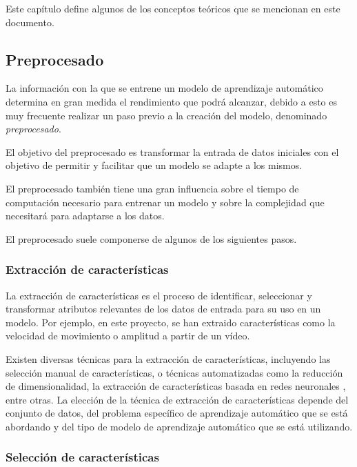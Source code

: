 \label{cha:Conceptos teóricos}

Este capítulo define algunos de los conceptos teóricos que se mencionan en este
documento.

\subsection{Preprocesado}

La información con la que se entrene un modelo de aprendizaje automático
determina en gran medida el rendimiento que podrá alcanzar, debido a esto es muy
frecuente realizar un paso previo a la creación del modelo, denominado
\textit{preprocesado}.

El objetivo del preprocesado es transformar la entrada de datos iniciales con el
objetivo de permitir y facilitar que un modelo se adapte a los mismos.

El preprocesado también tiene una gran influencia sobre el tiempo de computación
necesario para entrenar un modelo y sobre la complejidad que necesitará para
adaptarse a los datos.

El preprocesado suele componerse de algunos de los siguientes pasos.

\subsubsection{Extracción de características}

La extracción de características es el proceso de identificar, seleccionar y
transformar atributos relevantes de los datos de entrada para su uso en un
modelo. Por ejemplo, en este proyecto, se han extraido características como la
velocidad de movimiento o amplitud a partir de un vídeo.

Existen diversas técnicas para la extracción de características, incluyendo las
selección manual de características, o técnicas automatizadas como la reducción
de dimensionalidad, la extracción de características basada en redes neuronales
\cite{intrator1991feature}, entre otras. La elección de la técnica de extracción
de características depende del conjunto de datos, del problema específico de
aprendizaje automático que se está abordando y del tipo de modelo de aprendizaje
automático que se está utilizando.

\subsubsection{Selección de características}

